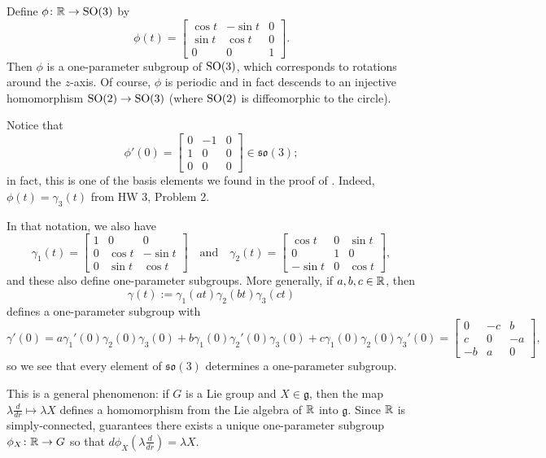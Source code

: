 \begin{example}\label{ex:one-parameter subgroup of SO(3)}
	Define $\phi \colon\thinspace\! \mathbb{R} \to \operatorname{SO}(3)$ by
	\[
		\phi(t) = \begin{bmatrix} \cos t & - \sin t & 0 \\ \sin t & \cos t & 0 \\ 0 & 0 & 1 \end{bmatrix}.
	\]
	Then $\phi$ is a one-parameter subgroup of $\operatorname{SO}(3)$, which corresponds to rotations around the $z$-axis. Of course, $\phi$ is periodic and in fact descends to an injective homomorphism $\operatorname{SO}(2) \to \operatorname{SO}(3)$ (where $\operatorname{SO}(2)$ is diffeomorphic to the circle).
	
	Notice that 
	\[
		\phi'(0) = \begin{bmatrix} 0 & -1 & 0 \\ 1 & 0 & 0 \\ 0 & 0 & 0 \end{bmatrix} \in \mathfrak{so}(3);
	\]
	in fact, this is one of the basis elements we found in the proof of . Indeed, $\phi(t) = \gamma_3(t)$ from HW 3, Problem 2.
	
	In that notation, we also have
	\[
		\gamma_1(t) = \begin{bmatrix} 1 & 0 & 0 \\ 0 & \cos t & - \sin t \\ 0 & \sin t & \cos t\end{bmatrix} \quad \text{and} \quad \gamma_2(t) = \begin{bmatrix} \cos t & 0 &  \sin t \\ 0 & 1 & 0 \\ -\sin t & 0 & \cos t \end{bmatrix},
	\]
	and these also define one-parameter subgroups. More generally, if $a,b,c \in \mathbb{R}$, then
	\[
		\gamma(t) := \gamma_1(at) \gamma_2(bt) \gamma_3(ct)
	\]
	defines a one-parameter subgroup with
	\[
		\gamma'(0) = a\gamma_1'(0) \gamma_2(0) \gamma_3(0) + b\gamma_1(0) \gamma_2'(0) \gamma_3(0) + c \gamma_1(0) \gamma_2(0) \gamma_3'(0) = \begin{bmatrix} 0 & -c & b \\ c & 0 & -a \\ -b & a & 0 \end{bmatrix},
	\]
	so we see that every element of $\mathfrak{so}(3)$ determines a one-parameter subgroup.
\end{example}

This is a general phenomenon: if $G$ is a Lie group and $X \in \mathfrak{g}$, then the map $\lambda \frac{d}{dr} \mapsto \lambda X$ defines a homomorphism from the Lie algebra of $\mathbb{R}$ into $\mathfrak{g}$. Since $\mathbb{R}$ is simply-connected,  guarantees there exists a unique one-parameter subgroup $\phi_X \colon\thinspace\! \mathbb{R} \to G$ so that $d\phi_X\left(\lambda \frac{d}{dr} \right) = \lambda X$.

